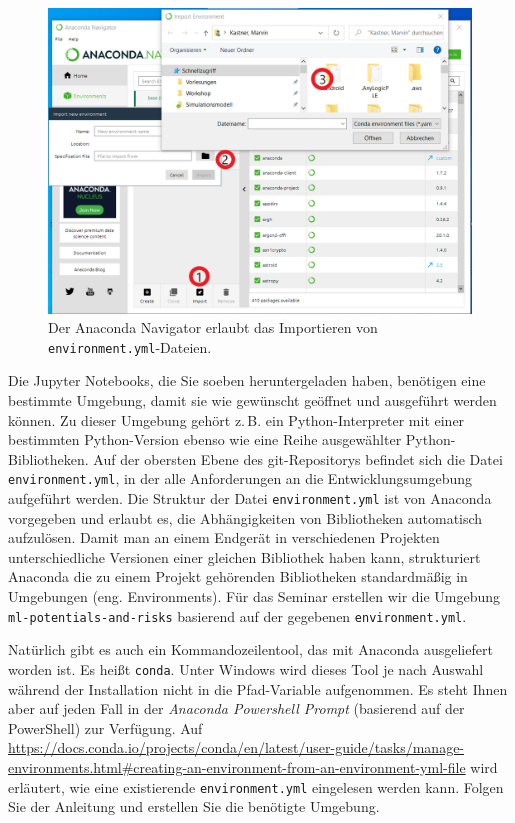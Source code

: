 \documentclass{tufte-handout}
\begin{document}
\begin{figure}[h]
  \includegraphics{anaconda-navigator-import-new-environment--mit-reihenfolge}
  \caption{Der Anaconda Navigator erlaubt das Importieren von \texttt{environment.yml}-Dateien.}%
\label{fig:anaconda-navigator}
\end{figure}

Die Jupyter Notebooks, die Sie soeben heruntergeladen haben, benötigen eine bestimmte Umgebung, damit sie wie gewünscht geöffnet und ausgeführt werden können.
Zu dieser Umgebung gehört z.\,B. ein Python-Interpreter mit einer bestimmten Python-Version ebenso wie eine Reihe ausgewählter Python-Bibliotheken.
Auf der obersten Ebene des git-Repositorys befindet sich die Datei \texttt{environment.yml}, in der alle Anforderungen an die Entwicklungsumgebung aufgeführt werden.
Die Struktur der Datei \texttt{environment.yml} ist von Anaconda vorgegeben und erlaubt es, die Abhängigkeiten von Bibliotheken automatisch aufzulösen.
Damit man an einem Endgerät in verschiedenen Projekten unterschiedliche Versionen einer gleichen Bibliothek haben kann,
strukturiert Anaconda die zu einem Projekt gehörenden Bibliotheken standardmäßig in Umgebungen (eng. Environments).
Für das Seminar erstellen wir die Umgebung
\texttt{ml-potentials-and-risks}
basierend auf der gegebenen \texttt{environment.yml}.

Natürlich gibt es auch ein Kommandozeilentool, das mit Anaconda ausgeliefert worden ist.
Es heißt \texttt{conda}.
Unter Windows wird dieses Tool je nach Auswahl während der Installation nicht in die Pfad-Variable aufgenommen.
Es steht Ihnen aber auf jeden Fall in der
\emph{Anaconda Powershell Prompt} (basierend auf der PowerShell)
zur Verfügung.
Auf
\url{https://docs.conda.io/projects/conda/en/latest/user-guide/tasks/manage-environments.html#creating-an-environment-from-an-environment-yml-file}
wird erläutert, wie eine existierende \texttt{environment.yml} eingelesen werden kann.
Folgen Sie der Anleitung und erstellen Sie die benötigte Umgebung.
\end{document}
